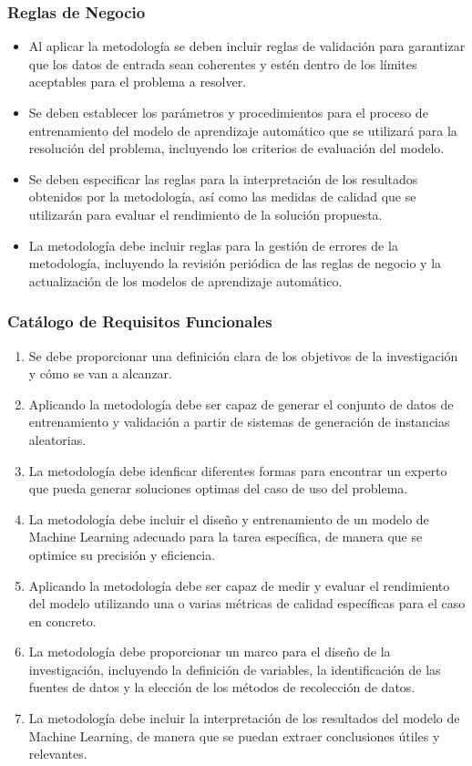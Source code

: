\subsubsection{Reglas de Negocio}
\begin{itemize}
    \item Al aplicar la metodología se deben incluir reglas 
    de validación para garantizar que los datos de entrada sean coherentes 
    y estén dentro de los límites aceptables para el problema a resolver.
    \item Se deben establecer los parámetros y procedimientos para el proceso 
    de entrenamiento del modelo de aprendizaje automático que se utilizará 
    para la resolución del problema, incluyendo los criterios de evaluación del modelo.
    \item Se deben especificar las reglas para la interpretación de los resultados 
    obtenidos por la metodología, así como las medidas de calidad que se utilizarán 
    para evaluar el rendimiento de la solución propuesta.
    \item La metodología debe incluir reglas para la gestión de errores
    de la metodología, incluyendo la revisión periódica de las reglas de negocio 
    y la actualización de los modelos de aprendizaje automático.
\end{itemize}
\subsubsection{Catálogo de Requisitos Funcionales}
\begin{enumerate}
    \renewcommand{\labelenumi}{RF\arabic{enumi}}
    \item Se debe proporcionar una definición clara de los objetivos de la investigación 
    y cómo se van a alcanzar.
    \item Aplicando la metodología debe ser capaz de generar el conjunto de datos de entrenamiento
    y validación a partir de sistemas de generación de instancias aleatorias.
    \item La metodología debe idenficar diferentes formas para encontrar un experto
    que pueda generar soluciones optimas del caso de uso del problema.
    \item La metodología debe incluir el diseño y entrenamiento de un modelo de Machine Learning 
    adecuado para la tarea específica, de manera que se optimice su precisión y eficiencia.
    \item Aplicando la metodología debe ser capaz de medir y evaluar el rendimiento del modelo 
    utilizando una o varias métricas de calidad específicas para el caso en concreto.
    \item La metodología debe proporcionar un marco para el diseño de la investigación, 
    incluyendo la definición de variables, la identificación de las fuentes de datos y 
    la elección de los métodos de recolección de datos.
    \item La metodología debe incluir la interpretación de los resultados del modelo 
    de Machine Learning, de manera que se puedan extraer conclusiones útiles y relevantes.
\end{enumerate}

